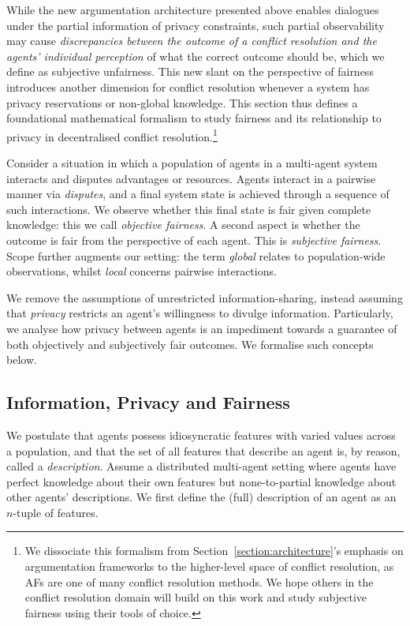 \documentclass[acmsmall]{custom-arxiv}  %
\begin{document}
While the new argumentation architecture presented above enables dialogues under the partial information of privacy constraints, such partial observability may cause \textit{discrepancies between the outcome of a conflict resolution and the agents’ individual perception} of what the correct outcome should be, which we define as subjective unfairness. This new slant on the perspective of fairness introduces another dimension for conflict resolution whenever a system has privacy reservations or non-global knowledge. This section thus defines a foundational mathematical formalism to study fairness and its relationship to privacy in decentralised conflict resolution.\footnote{We dissociate this formalism from Section~\ref{section:architecture}'s emphasis on argumentation frameworks to the higher-level space of conflict resolution, as AFs are one of many conflict resolution methods. We hope others in the conflict resolution domain will build on this work and study subjective fairness using their tools of choice.}

Consider a situation in which a population of agents in a multi-agent system interacts and disputes advantages or resources. Agents interact in a pairwise manner via \textit{disputes}, and a final system state is achieved through a sequence of such interactions. We observe whether this final state is fair given complete knowledge: this we call \textit{objective fairness}. A second aspect is whether the outcome is fair from the perspective of each agent. This is \textit{subjective fairness}. Scope further augments our setting: the term \textit{global} relates to population-wide observations, whilst \textit{local} concerns pairwise interactions.

We remove the assumptions of unrestricted information-sharing, instead assuming that \textit{privacy} restricts an agent's willingness to divulge information. Particularly, we analyse how privacy between agents is an impediment towards a guarantee of both objectively and subjectively fair outcomes. We formalise such concepts below. 



\subsection{Information, Privacy and Fairness}

We postulate that agents possess idiosyncratic features with varied values across a population, and that the set of all features that describe
an agent is, by reason, called a \textit{description}. Assume a distributed multi-agent setting where agents have perfect knowledge about their own features but none-to-partial knowledge about other agents' descriptions. We first define the (full) description of an agent as an $n$-tuple of features.%
\end{document}
